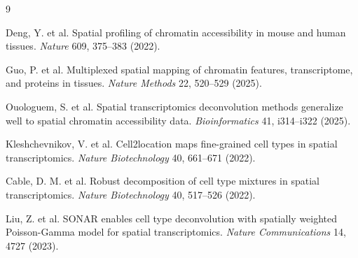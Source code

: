 \documentclass[11pt]{article}
\begin{document}
\begin{thebibliography}{9}

Deng, Y. et al. Spatial profiling of chromatin accessibility in mouse and human tissues. \emph{Nature} 609, 375--383 (2022).

Guo, P. et al. Multiplexed spatial mapping of chromatin features, transcriptome, and proteins in tissues. \emph{Nature Methods} 22, 520--529 (2025).

Ouologuem, S. et al. Spatial transcriptomics deconvolution methods generalize well to spatial chromatin accessibility data. \emph{Bioinformatics} 41, i314--i322 (2025).

Kleshchevnikov, V. et al. Cell2location maps fine-grained cell types in spatial transcriptomics. \emph{Nature Biotechnology} 40, 661--671 (2022).

Cable, D. M. et al. Robust decomposition of cell type mixtures in spatial transcriptomics. \emph{Nature Biotechnology} 40, 517--526 (2022).

Liu, Z. et al. SONAR enables cell type deconvolution with spatially weighted Poisson-Gamma model for spatial transcriptomics. \emph{Nature Communications} 14, 4727 (2023).

\end{thebibliography}
\end{document}
